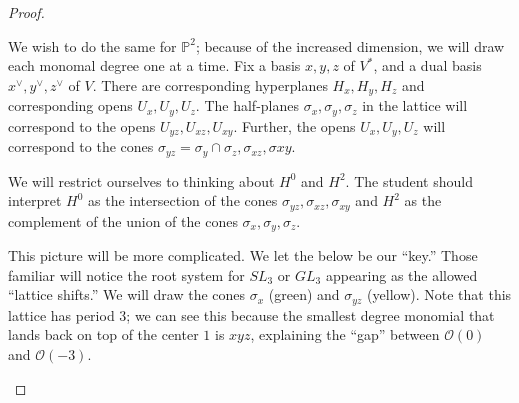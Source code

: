 \documentclass[10pt]{article}
\theoremstyle{definition}
\newcommand{\PP}{\mathbb{P}}
\newcommand{\OO}{\mathcal{O}}
\begin{document}
\begin{proof}
\begin{center}
\end{center}

We wish to do the same for $\PP^2$; because of the increased dimension, we will draw each monomal degree one at a time.  Fix a basis $x, y, z$ of $V^*$, and a dual basis $x^\vee, y^\vee, z^\vee$ of $V$.  There are corresponding hyperplanes $H_x, H_y, H_z$ and corresponding opens $U_x, U_y, U_z$.  The half-planes $\sigma_x, \sigma_y, \sigma_z$ in the lattice will correspond to the opens $U_{yz}, U_{xz}, U_{xy}$.  Further, the opens $U_x, U_y, U_z$ will correspond to  the cones $\sigma_{yz} = \sigma_y \cap \sigma_z, \sigma_{xz}, \sigma{xy}$.

We will restrict ourselves to thinking about $H^0$ and $H^2$.  The student should interpret $H^0$ as the intersection of the cones $\sigma_{yz}, \sigma_{xz}, \sigma_{xy}$ and $H^2$ as the complement of the union of the cones $\sigma_x, \sigma_y, \sigma_z$.

This picture will be more complicated.  We let the below be our ``key.''  Those familiar will notice the root system for $SL_3$ or $GL_3$ appearing as the allowed ``lattice shifts.''  We will draw the cones $\sigma_x$ (green) and $\sigma_{yz}$ (yellow).  Note that this lattice has period 3; we can see this because the smallest degree monomial that lands back on top of the center $1$ is $xyz$, explaining the ``gap'' between $\OO(0)$ and $\OO(-3)$.
\begin{center}


\end{center}
\end{proof}
\end{document}
